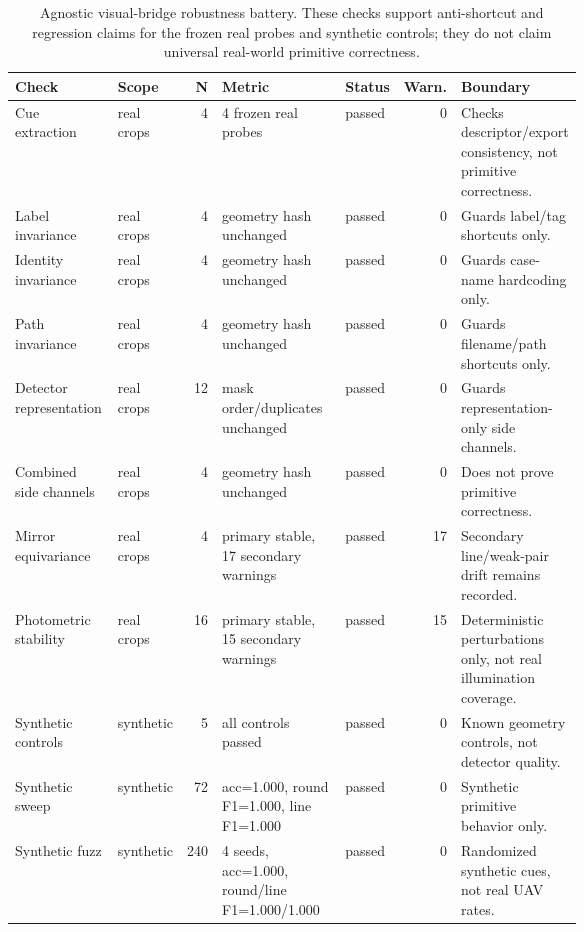 \begin{table}[H]
\centering
\scriptsize
\setlength{\tabcolsep}{2.5pt}
\renewcommand{\arraystretch}{1.06}
\caption{Agnostic visual-bridge robustness battery. These checks support anti-shortcut and regression claims for the frozen real probes and synthetic controls; they do not claim universal real-world primitive correctness.}
\label{tab:sppa-visual-bridge-robustness}
\begin{tabularx}{\linewidth}{@{}L{0.19\linewidth}L{0.11\linewidth}rL{0.26\linewidth}L{0.10\linewidth}rY@{}}
\toprule
Check & Scope & N & Metric & Status & Warn. & Boundary \\
\midrule
Cue extraction & real crops & 4 & 4 frozen real probes & passed & 0 & Checks descriptor/export consistency, not primitive correctness. \\
Label invariance & real crops & 4 & geometry hash unchanged & passed & 0 & Guards label/tag shortcuts only. \\
Identity invariance & real crops & 4 & geometry hash unchanged & passed & 0 & Guards case-name hardcoding only. \\
Path invariance & real crops & 4 & geometry hash unchanged & passed & 0 & Guards filename/path shortcuts only. \\
Detector representation & real crops & 12 & mask order/duplicates unchanged & passed & 0 & Guards representation-only side channels. \\
Combined side channels & real crops & 4 & geometry hash unchanged & passed & 0 & Does not prove primitive correctness. \\
Mirror equivariance & real crops & 4 & primary stable, 17 secondary warnings & passed & 17 & Secondary line/weak-pair drift remains recorded. \\
Photometric stability & real crops & 16 & primary stable, 15 secondary warnings & passed & 15 & Deterministic perturbations only, not real illumination coverage. \\
Synthetic controls & synthetic & 5 & all controls passed & passed & 0 & Known geometry controls, not detector quality. \\
Synthetic sweep & synthetic & 72 & acc=1.000, round F1=1.000, line F1=1.000 & passed & 0 & Synthetic primitive behavior only. \\
Synthetic fuzz & synthetic & 240 & 4 seeds, acc=1.000, round/line F1=1.000/1.000 & passed & 0 & Randomized synthetic cues, not real UAV rates. \\
\bottomrule
\end{tabularx}
\end{table}
